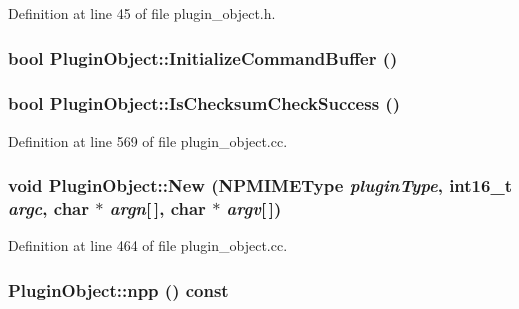 Definition at line 45 of file plugin\_\-object.h.

\hypertarget{class_plugin_object_add4437ed89953c9617ef7bd07ae32194}{
\subsubsection[{InitializeCommandBuffer}]{\setlength{\rightskip}{0pt plus 5cm}bool PluginObject::InitializeCommandBuffer ()}}
\label{class_plugin_object_add4437ed89953c9617ef7bd07ae32194}
\hypertarget{class_plugin_object_a4f594d05bd890649ca0f87ce30f03d26}{
\subsubsection[{IsChecksumCheckSuccess}]{\setlength{\rightskip}{0pt plus 5cm}bool PluginObject::IsChecksumCheckSuccess ()}}
\label{class_plugin_object_a4f594d05bd890649ca0f87ce30f03d26}


Definition at line 569 of file plugin\_\-object.cc.

\hypertarget{class_plugin_object_a5e103c3aefcd2afb642c2414b92311ac}{
\subsubsection[{New}]{\setlength{\rightskip}{0pt plus 5cm}void PluginObject::New ({\bf NPMIMEType} {\em pluginType}, \/  int16\_\-t {\em argc}, \/  char $\ast$ {\em argn}\mbox{[}$\,$\mbox{]}, \/  char $\ast$ {\em argv}\mbox{[}$\,$\mbox{]})}}
\label{class_plugin_object_a5e103c3aefcd2afb642c2414b92311ac}


Definition at line 464 of file plugin\_\-object.cc.

\hypertarget{class_plugin_object_a1a051ee92618bae8134b4d273d1d9982}{
\subsubsection[{npp}]{ PluginObject::npp () const}}
\label{class_plugin_object_a1a051ee92618bae8134b4d273d1d9982}


